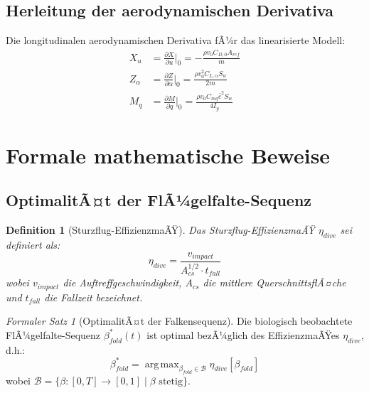 ﻿\documentclass[12pt,a4paper]{article}
\newtheorem{definition}{Definition}[section]
\theoremstyle{remark}
\newtheorem{formalersatz}{Formaler Satz}[section]
\DeclareMathOperator*{\argmax}{arg\,max}
\begin{document}
	\subsection{Herleitung der aerodynamischen Derivativa}
	
	Die longitudinalen aerodynamischen Derivativa fÃ¼r das linearisierte Modell:
	\begin{align}
		X_u &= \frac{\partial X}{\partial u}\bigg|_0 = -\frac{\rho v_0 C_{D,0} A_{ref}}{m} \\
		Z_\alpha &= \frac{\partial Z}{\partial \alpha}\bigg|_0 = \frac{\rho v_0^2 C_{L,\alpha} S_w}{2m} \\
		M_q &= \frac{\partial M}{\partial q}\bigg|_0 = \frac{\rho v_0 C_{mq} \bar{c}^2 S_w}{4 I_y}
	\end{align}
	
	\section{Formale mathematische Beweise}
	\label{sec:formal}
	
	\subsection{OptimalitÃ¤t der FlÃ¼gelfalte-Sequenz}
	
	\begin{definition}[Sturzflug-EffizienzmaÃŸ]
		\label{def:effizienz}
		Das Sturzflug-EffizienzmaÃŸ $\eta_{dive}$ sei definiert als:
		\begin{equation}
			\eta_{dive} = \frac{v_{impact}}{A_{cs}^{1/2} \cdot t_{fall}}
		\end{equation}
		wobei $v_{impact}$ die Auftreffgeschwindigkeit, $A_{cs}$ die mittlere QuerschnittsflÃ¤che und $t_{fall}$ die Fallzeit bezeichnet.
	\end{definition}
	
	\begin{formalersatz}[OptimalitÃ¤t der Falkensequenz]
		Die biologisch beobachtete FlÃ¼gelfalte-Sequenz $\beta^*_{fold}(t)$ ist optimal bezÃ¼glich des EffizienzmaÃŸes $\eta_{dive}$, d.h.:
		\begin{equation}
			\beta^*_{fold} = \argmax_{\beta_{fold} \in \mathcal{B}} \eta_{dive}[\beta_{fold}]
		\end{equation}
		wobei $\mathcal{B} = \{\beta: [0,T] \to [0,1] \mid \beta \text{ stetig}\}$.
	\end{formalersatz}
	
\end{document}
